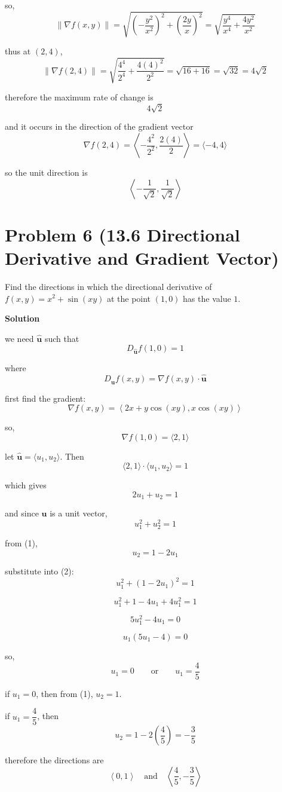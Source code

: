 \documentclass{article}
\newcommand{\solution}{\textbf{\large Solution}}
\theoremstyle{remark}
\begin{document}
so,
\[
    \|\nabla f(x,y)\| = \sqrt{\left(-\frac{y^2}{x^2}\right)^2 + \left(\frac{2y}{x}\right)^2}
    = \sqrt{\frac{y^4}{x^4} + \frac{4y^2}{x^2}}
\]

thus at $(2,4)$,
\[
    \|\nabla f(2,4)\| = \sqrt{\frac{4^4}{2^4} + \frac{4(4)^2}{2^2}}
    = \sqrt{16+16}
    = \sqrt{32} = 4\sqrt{2}
\]

therefore the maximum rate of change is
\[
    \boxed{4\sqrt{2}}
\]

and it occurs in the direction of the gradient vector
\[
    \nabla f(2,4) = \left\langle -\frac{4^2}{2^2}, \frac{2(4)}{2} \right\rangle = \langle -4,4 \rangle
\]

so the unit direction is
\[
    \boxed{\left\langle -\frac{1}{\sqrt{2}}, \frac{1}{\sqrt{2}} \right\rangle}
\]

\vspace{1em}
\hrulefill

\section*{Problem 6 (13.6 Directional Derivative and Gradient Vector)}
Find the directions in which the directional derivative of $f(x,y) = x^2 + \sin(xy)$ at the point $(1,0)$ has the value $1$.

\medskip
\solution

we need $\hat{\mathbf{u}}$ such that
\[
    D_{\hat{\mathbf{u}}}f(1,0) = 1
\]

where
\[
    D_{\hat{\mathbf{u}}}f(x,y) = \nabla f(x,y)\cdot \hat{\mathbf{u}}
\]

first find the gradient:
\[
    \nabla f(x,y) = \left\langle 2x + y\cos(xy), x\cos(xy) \right\rangle
\]

so,
\[
    \nabla f(1,0) = \langle 2,1 \rangle
\]

let $\hat{\mathbf{u}} = \langle u_1,u_2 \rangle$. Then
\[
    \langle 2,1 \rangle \cdot \langle u_1,u_2 \rangle = 1
\]

which gives
\[
    2u_1 + u_2 = 1 \tag{1}
\]

and since $\hat{\mathbf{u}}$ is a unit vector,
\[
    u_1^2 + u_2^2 = 1 \tag{2}
\]

from (1),
\[
    u_2 = 1 - 2u_1
\]

substitute into (2):
\[
    u_1^2 + (1-2u_1)^2 = 1
\]

\[
    u_1^2 + 1 - 4u_1 + 4u_1^2 = 1
\]

\[
    5u_1^2 - 4u_1 = 0
\]

\[
    u_1(5u_1-4)=0
\]

so,
\[
    u_1 = 0 \qquad \text{or} \qquad u_1 = \frac{4}{5}
\]

if $u_1=0$, then from (1), $u_2=1$.

if $u_1=\dfrac{4}{5}$, then
\[
    u_2 = 1 - 2\left(\frac{4}{5}\right) = -\frac{3}{5}
\]

therefore the directions are
\[
    \boxed{\left\langle 0,1 \right\rangle \quad \text{and} \quad \left\langle \frac{4}{5}, -\frac{3}{5} \right\rangle}
\]
\end{document}
